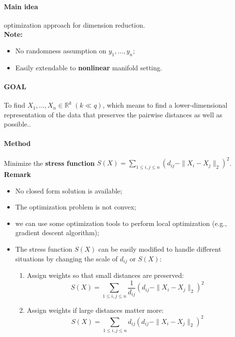 \documentclass[12pt]{book}
\theoremstyle{definition}
\theoremstyle{remark}
\newcommand{\R}{\mathbb{R}}
\begin{document}
\paragraph{Main idea}
optimization approach for dimension reduction.\\

\textbf{Note: } 
\begin{itemize}
    \item No randomness assumption on $y_1, \dots, y_n$;
    \item Easily extendable to \textbf{nonlinear} manifold setting.\\
\end{itemize}

\paragraph{GOAL}
To find $X_1, \dots, X_n \in \R^k\;(k\ll q)$, which means to find a lower-dimensional representation of the data that preserves the
pairwise distances as well as possible..\\

\paragraph{Method} Minimize the \textbf{stress function} $S(X) = \sum_{1\le i,j\le n}(d_{ij} - \|X_i - X_j\|_2)^2$.\\

\textbf{Remark} 
\begin{itemize}
    \item No closed form solution is available;
    \item The optimization problem is not convex;
    \item we can use some optimization tools to perform local optimization (e.g., gradient descent algorithm);
    \item The stress function $S(X)$ can be easily modified to handle different situations by changing the scale of $d_{ij}$ or $S(X)$:
    \begin{enumerate}
        \item Assign weights so that small distances are preserved:
        \[S(X) = \sum_{1\le i,j\le n}\frac{1}{d_{ij} }(d_{ij} - \|X_i - X_j\|_2)^2\]
        \item Assign weights if large distances matter more:
        \[S(X) = \sum_{1\le i,j\le n}d_{ij}(d_{ij} - \|X_i - X_j\|_2)^2\]
    \end{enumerate}
\end{itemize}
\end{document}

